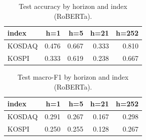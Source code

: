 \begin{table}[t]\centering
\caption{Test accuracy by horizon and index (RoBERTa).}
\begin{tabular}{lrrrr}
\toprule
index & h=1 & h=5 & h=21 & h=252 \\
\midrule
KOSDAQ & 0.476 & 0.667 & 0.333 & 0.810 \\
KOSPI & 0.333 & 0.619 & 0.238 & 0.667 \\
\bottomrule
\end{tabular}
\end{table}

\begin{table}[t]\centering
\caption{Test macro-F1 by horizon and index (RoBERTa).}
\begin{tabular}{lrrrr}
\toprule
index & h=1 & h=5 & h=21 & h=252 \\
\midrule
KOSDAQ & 0.291 & 0.267 & 0.167 & 0.298 \\
KOSPI & 0.250 & 0.255 & 0.128 & 0.267 \\
\bottomrule
\end{tabular}
\end{table}